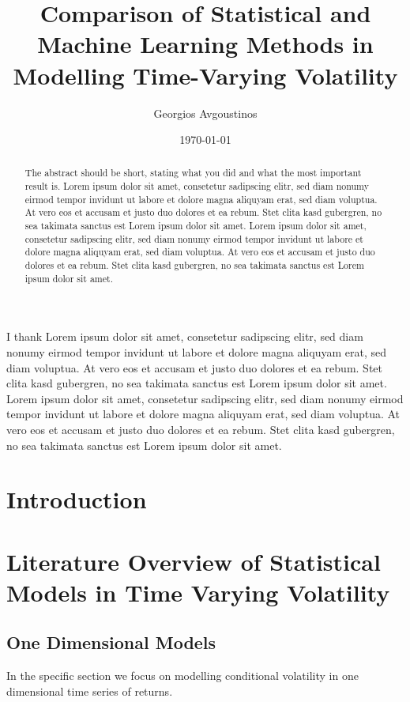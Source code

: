 \documentclass[a4paper, oneside]{discothesis}
\title{Comparison of Statistical and Machine Learning Methods in Modelling Time-Varying Volatility 
}
\author{Georgios Avgoustinos}
\institute{Department of Banking and Finance\\
University of Zurich}
\date{\today}
\begin{document}
\frontmatter %
\maketitle

\cleardoublepage

\begin{acknowledgements}
	I thank Lorem ipsum dolor sit amet, consetetur sadipscing elitr, sed diam nonumy eirmod tempor invidunt ut labore et dolore magna aliquyam erat, sed diam voluptua. At vero eos et accusam et justo duo dolores et ea rebum. Stet clita kasd gubergren, no sea takimata sanctus est Lorem ipsum dolor sit amet. Lorem ipsum dolor sit amet, consetetur sadipscing elitr, sed diam nonumy eirmod tempor invidunt ut labore et dolore magna aliquyam erat, sed diam voluptua. At vero eos et accusam et justo duo dolores et ea rebum. Stet clita kasd gubergren, no sea takimata sanctus est Lorem ipsum dolor sit amet.
\end{acknowledgements}


\begin{abstract}
    The abstract should be short, stating what you did and what the most important result is.
	Lorem ipsum dolor sit amet, consetetur sadipscing elitr, sed diam nonumy eirmod tempor invidunt ut labore et dolore magna aliquyam erat, sed diam voluptua. At vero eos et accusam et justo duo dolores et ea rebum. Stet clita kasd gubergren, no sea takimata sanctus est Lorem ipsum dolor sit amet. Lorem ipsum dolor sit amet, consetetur sadipscing elitr, sed diam nonumy eirmod tempor invidunt ut labore et dolore magna aliquyam erat, sed diam voluptua. At vero eos et accusam et justo duo dolores et ea rebum. Stet clita kasd gubergren, no sea takimata sanctus est Lorem ipsum dolor sit amet.
\end{abstract}

\tableofcontents

\mainmatter %

\chapter{Introduction}

\chapter{Literature Overview of Statistical Models in Time Varying Volatility}

\section{One Dimensional Models}
In the specific section we focus on modelling conditional volatility in one dimensional time series of returns. 
\end{document}

